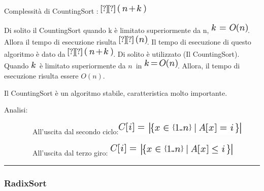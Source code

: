 \documentclass{article}
\begin{document}
{{Complessità di CountingSort : }\includegraphics{images/image188.png}


{Di solito il CountingSort quando k è limitato superiormente da n,
}\includegraphics{images/image189.png}{. Allora il tempo di esecuzione
risulta }\includegraphics{images/image190.png}{. }{Il tempo di
esecuzione di questo algoritmo è dato da
}\includegraphics{images/image188.png}{. Di solito è utilizzato (Il
CountingSort). Quando }\includegraphics{images/image118.png}{~è limitato
superiormente da }$n${~in
}\includegraphics{images/image191.png}{. Allora, il tempo di esecuzione
risulta essere }$O(n)${.}

{Il CountingSort è un algoritmo stabile, caratteristica molto
importante.}

{Analisi:}

{~~~~~~~~All'uscita dal secondo
ciclo:}\includegraphics{images/image192.png}

{~~~~~~~~All'uscita dal terzo giro:
}\includegraphics{images/image193.png}



\begin{center}\rule{0.5\linewidth}{\linethickness}\end{center}

\subsubsection{\texorpdfstring{{}}{}}\label{h.f4yzmjxt5mx}

\hypertarget{h.ixohzh3ypk6v}{\subsubsection{\texorpdfstring{{RadixSort}}{RadixSort}}\label{h.ixohzh3ypk6v}}

}
\end{document}
